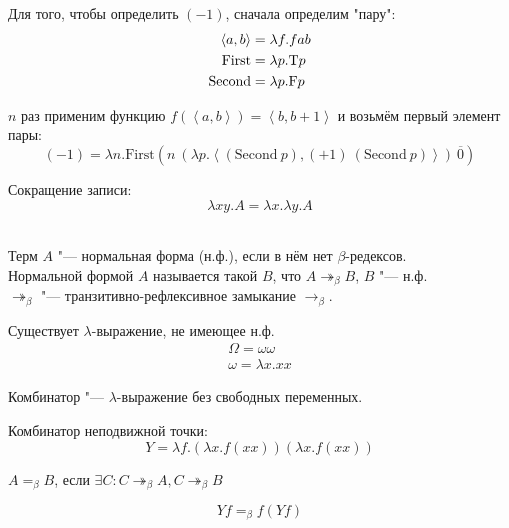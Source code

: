 Для того, чтобы определить $(-1)$, сначала определим "пару":
\begin{alignat*}{2}
    \left<a,b\right> &= \lambda f.f a b \\
    \mathrm{First} &= \lambda p . \mathrm{T} p \\
    \mathrm{Second} &= \lambda p . \mathrm{F} p
\end{alignat*}

$n$ раз применим функцию $f\left(\left<a,b\right>\right) = \left<b,b+1\right>$ и возьмём первый элемент пары:
\[
    (-1) = \lambda n . \mathrm{First} \left(n\ (\lambda p . \left<\left(\mathrm{Second}\ p\right), (+1)\ (\mathrm{Second}\ p)\right>)\ \overline{0}\right)
\]

Сокращение записи:
\[
    \lambda x y . A = \lambda x . \lambda y . A
\]

\begin{definition} \mbox{} \\
    Терм $A$ "--- нормальная форма (н.ф.), если в нём нет $\beta$-редексов. \\
    Нормальной формой $A$ называется такой $B$, что $A \twoheadrightarrow_{\beta} B$, $B$ "--- н.ф. \\
    $\twoheadrightarrow_{\beta}$ "--- транзитивно-рефлексивное замыкание $\rightarrow_{\beta}$.
\end{definition}

\begin{statement}
    Существует $\lambda$-выражение, не имеющее н.ф.
    \begin{gather*}
        \Omega = \omega \omega \\
        \omega = \lambda x . x x
    \end{gather*}
\end{statement}

\begin{definition}[Комбинатор]
    Комбинатор "--- $\lambda$-выражение без свободных переменных.
\end{definition}

Комбинатор неподвижной точки:
\[
    Y = \lambda f . (\lambda x . f (x x)) (\lambda x . f (x x))
\]

\begin{definition}
    $A=_{\beta}B$, если $\exists C : C \twoheadrightarrow_{\beta} A, C \twoheadrightarrow_{\beta}B$
\end{definition}

\begin{statement}
    \[
        Yf =_{\beta} f(Yf)
    \]
\end{statement}

